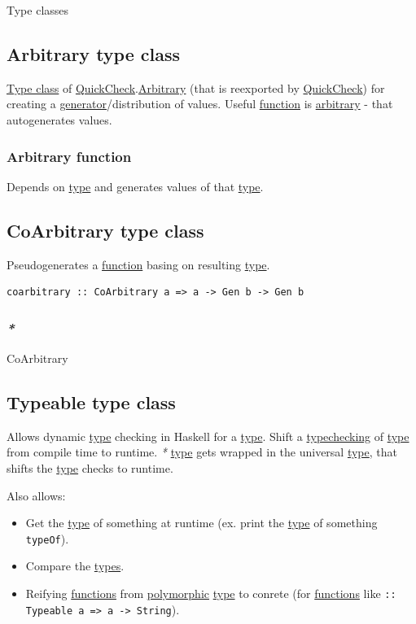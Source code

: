 \documentclass[a4paper,14pt,oneside]{book}
\begin{document}
\label{org59800da}Type classes

\subsection{\label{org5800033}Arbitrary type class}
\label{sec:org3e2fa8e}
\hyperref[org8cb2c3b]{Type class} of \hyperref[org2b2f437]{QuickCheck}.\hyperref[org326f4d0]{Arbitrary} (that is reexported by \hyperref[org2b2f437]{QuickCheck}) for creating a \hyperref[org9b8f3b1]{generator}/distribution of values.
Useful \hyperref[org679af45]{function} is \hyperref[org326f4d0]{arbitrary} - that autogenerates values.

\subsubsection{\label{orgf72c4b2}Arbitrary function}
\label{sec:org9dcb130}
Depends on \hyperref[org1eff537]{type} and generates values of that \hyperref[org1eff537]{type}.

\subsection{\label{org0ca1394}CoArbitrary type class}
\label{sec:orgecbd1d4}
Pseudogenerates a \hyperref[org679af45]{function} basing on resulting \hyperref[org1eff537]{type}.
\begin{verbatim}
coarbitrary :: CoArbitrary a => a -> Gen b -> Gen b
\end{verbatim}

\subsubsection{\emph{*}}
\label{sec:orgb1499f7}

\label{orga6f02e0}CoArbitrary

\subsection{\label{org3949ce9}Typeable type class}
\label{sec:orge546327}
Allows dynamic \hyperref[org1eff537]{type} checking in Haskell for a \hyperref[org1eff537]{type}.
Shift a \hyperref[org3aaaa4d]{typechecking} of \hyperref[org1eff537]{type} from compile time to runtime.
\emph{*} \hyperref[org1eff537]{type} gets wrapped in the universal \hyperref[org1eff537]{type}, that shifts the \hyperref[org1eff537]{type} checks to runtime.

Also allows:
\begin{itemize}
\item Get the \hyperref[org1eff537]{type} of something at runtime (ex. print the \hyperref[org1eff537]{type} of something \texttt{typeOf}).
\item Compare the \hyperref[orge9a3a14]{types}.
\item Reifying \hyperref[org934327c]{functions} from \hyperref[org5ea9f01]{polymorphic} \hyperref[org1eff537]{type} to conrete (for \hyperref[org934327c]{functions} like \texttt{:: Typeable a => a -> String}).
\end{itemize}
\end{document}
